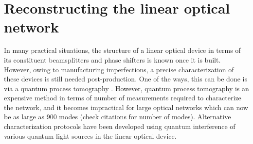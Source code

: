 \documentclass[aps,rmp,twocolumn,amsmath,amssymb,nofootinbib,superscriptaddress]{revtex4}
\begin{document}
\section{Reconstructing the linear optical network}

In many practical situations, the structure of a linear optical device in terms of its constituent beamsplitters and phase shifters is known once it is built. However, owing to manufacturing imperfections, a precise characterization of these devices is still needed post-production. One of the ways, this can be done is via a quantum process tomography \cite{bib:Mitchell03,bib:Obrien04,bib:Lobino08,bib:Saleh11} . However, quantum process tomography is an expensive method in terms of number of measurements required to characterize the network, and it becomes impractical for large optical networks which can now be as large as 900 modes (check citations for number of modes). Alternative characterization protocols have been developed using quantum interference of various quantum light sources \cite{bib:Laing12,bib:Rahimi-Keshari13} in the linear optical device.
\end{document}
